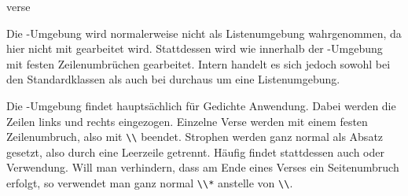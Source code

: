   \begin{Declaration}
    \begin{Environment}{verse}\end{Environment}
  \end{Declaration}%
  Die
  -Umgebung wird normalerweise nicht als
  Listenumgebung wahrgenommen, da hier nicht mit  gearbeitet
  wird. Stattdessen wird wie innerhalb der -Umgebung
  mit festen Zeilenumbrüchen gearbeitet. Intern handelt es sich jedoch sowohl
  bei den Standardklassen als auch bei {\KOMAScript} durchaus um eine
  Listenumgebung.

  Die -Umgebung findet hauptsächlich für
  Gedichte Anwendung. Dabei werden die Zeilen links und rechts
  eingezogen. Einzelne Verse werden mit einem festen Zeilenumbruch, also mit
  \verb|\\|\IndexCmd{\textbackslash} beendet. Strophen werden ganz normal als
  Absatz gesetzt, also durch eine Leerzeile getrennt.  Häufig findet
  stattdessen auch  oder
   Verwendung. Will man verhindern, dass am
  Ende eines Verses ein Seitenumbruch erfolgt, so
  verwendet man ganz normal \verb|\\*|\IndexCmd{\textbackslash*} anstelle von
  \verb|\\|.%
